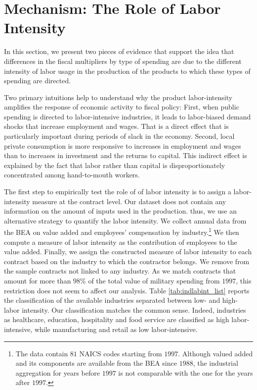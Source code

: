 \documentclass[dv_diss_main.tex]{subfiles}
\begin{document}
\section{Mechanism: The Role of Labor Intensity}\label{sec:lab_int}


In this section, we present two pieces of evidence that support the idea that differences in the fiscal multipliers by type of spending are due to the different intensity of labor usage in the production of the products to which these types of spending are directed.


Two primary intuitions help to understand why the product labor-intensity amplifies the response of economic activity to fiscal policy: First, when public spending is directed to labor-intensive industries, it leads to labor-biased demand shocks that increase employment and wages. That is a direct effect that is particularly important during periods of slack in the economy. Second, local private consumption is more responsive to increases in employment and wages than to increases in investment and the returns to capital. This indirect effect is explained by the fact that labor rather than capital is disproportionately concentrated among hand-to-mouth workers. 

The first step to empirically test the role of of labor intensity is to assign a labor-intensity measure at the contract level. Our dataset does not contain any information on the amount of inputs used in the production. thus, we use an alternative strategy to quantify the labor intensity. We collect annual data from the BEA on value added and employees' compensation by industry.\footnote{The data contain $81$ NAICS codes starting from $1997$. Although valued added and its components are available from the BEA since $1988$, the industrial aggregation for years before $1997$ is not comparable with the one for the years after $1997$.} We then compute a measure of labor intensity as the contribution of employees to the value added. Finally, we assign the constructed measure of labor intensity to each contract based on the industry to which the contractor belongs. We remove from the sample contracts not linked to any industry. As we match contracts that amount for more than $98\%$ of the total value of military spending from $1997$, this restriction does not seem to affect our analysis. Table \ref{tab:indlabint_list} reports the classification of the available industries separated between low- and high-labor intensity. Our classification matches the common sense. Indeed, industries as healthcare, education, hospitality and food service are classified as high labor-intensive, while manufacturing and retail as low labor-intensive.
\end{document}
